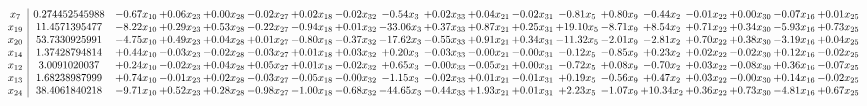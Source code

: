 \documentclass[9pt]{article}
\begin{document}
 \[\begin{array}{c| c c@{\hskip 2pt} c@{\hskip 2pt} c@{\hskip 2pt} c@{\hskip 2pt} c@{\hskip 2pt} c@{\hskip 2pt} c@{\hskip 2pt} c@{\hskip 2pt} c@{\hskip 2pt} c@{\hskip 2pt} c@{\hskip 2pt} c@{\hskip 2pt} c@{\hskip 2pt} c@{\hskip 2pt} c@{\hskip 2pt} c@{\hskip 2pt} c@{\hskip 2pt} }
 x_{7}   &  0.274452545988 & -0.67 x_{10} & +  0.06 x_{23} & +  0.00 x_{28} & -0.02 x_{27} & +  0.02 x_{18} & -0.02 x_{32} & -0.54 x_{3} & +  0.02 x_{33} & +  0.04 x_{21} & -0.02 x_{31} & -0.81 x_{5} & +  0.80 x_{9} & -0.44 x_{2} & -0.01 x_{22} & +  0.00 x_{30} & -0.07 x_{16} & +  0.01 x_{25}\\
 x_{19}   &  11.4571395477 & -8.22 x_{10} & +  0.29 x_{23} & +  0.53 x_{28} & -0.22 x_{27} & -0.94 x_{18} & +  0.01 x_{32} & -33.06 x_{3} & +  0.37 x_{33} & +  0.87 x_{21} & +  0.25 x_{31} & + 19.10 x_{5} & -8.71 x_{9} & +  8.54 x_{2} & +  0.71 x_{22} & +  0.34 x_{30} & -5.93 x_{16} & +  0.73 x_{25}\\
 x_{20}   &  53.7330925991 & -4.75 x_{10} & +  0.49 x_{23} & +  0.04 x_{28} & +  0.01 x_{27} & -0.80 x_{18} & -0.37 x_{32} & -17.62 x_{3} & -0.55 x_{33} & +  0.91 x_{21} & +  0.34 x_{31} & -11.32 x_{5} & -2.01 x_{9} & -2.81 x_{2} & +  0.70 x_{22} & +  0.38 x_{30} & -3.19 x_{16} & +  0.04 x_{25}\\
 x_{14}   &  1.37428794814 & +  0.44 x_{10} & -0.03 x_{23} & -0.02 x_{28} & -0.03 x_{27} & +  0.01 x_{18} & +  0.03 x_{32} & +  0.20 x_{3} & -0.03 x_{33} & -0.00 x_{21} & -0.00 x_{31} & -0.12 x_{5} & -0.85 x_{9} & +  0.23 x_{2} & +  0.02 x_{22} & -0.02 x_{30} & +  0.12 x_{16} & -0.02 x_{25}\\
 x_{12}   &  3.0091020037 & +  0.24 x_{10} & -0.02 x_{23} & +  0.04 x_{28} & +  0.05 x_{27} & +  0.01 x_{18} & -0.02 x_{32} & +  0.65 x_{3} & -0.00 x_{33} & -0.05 x_{21} & +  0.00 x_{31} & -0.72 x_{5} & +  0.08 x_{9} & -0.70 x_{2} & +  0.03 x_{22} & -0.08 x_{30} & +  0.36 x_{16} & -0.07 x_{25}\\
 x_{13}   &  1.68238987999 & +  0.74 x_{10} & -0.01 x_{23} & +  0.02 x_{28} & -0.03 x_{27} & -0.05 x_{18} & -0.00 x_{32} & -1.15 x_{3} & -0.02 x_{33} & +  0.01 x_{21} & -0.01 x_{31} & +  0.19 x_{5} & -0.56 x_{9} & +  0.47 x_{2} & +  0.03 x_{22} & -0.00 x_{30} & +  0.14 x_{16} & -0.02 x_{25}\\
 x_{24}   &  38.4061840218 & -9.71 x_{10} & +  0.52 x_{23} & +  0.28 x_{28} & -0.98 x_{27} & -1.00 x_{18} & -0.68 x_{32} & -44.65 x_{3} & -0.44 x_{33} & +  1.93 x_{21} & +  0.01 x_{31} & +  2.23 x_{5} & -1.07 x_{9} & + 10.34 x_{2} & +  0.36 x_{22} & +  0.73 x_{30} & -4.81 x_{16} & +  0.67 x_{25}\\

\end{array}\]
\end{document}
